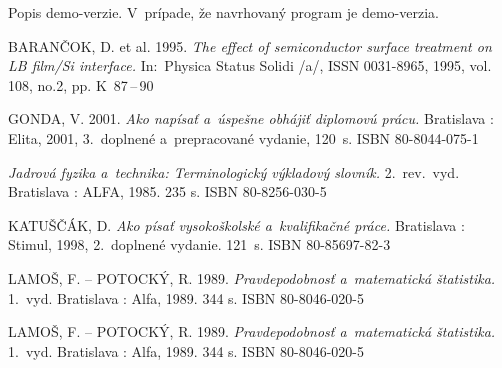\documentclass[a4paper]{pouzivatelskaPrirucka}
\begin{document}
Popis demo-verzie. V~prípade, že navrhovaný program je demo-verzia.

\newpage\def\refname{Zoznam použitej literatúry}

\begin{thebibliography}{999}
BARANČOK, D. et al. 1995. \emph{The effect of semiconductor surface treatment on LB film/Si interface.} In:~Physica Status Solidi /a/,  ISSN 0031-8965, 1995, vol. 108, no.2, pp. K~87\,--\,90

GONDA, V. 2001. \emph{Ako napísať a~úspešne obhájiť diplomovú prácu.} Bratislava : Elita, 2001, 3.~doplnené a~prepracované vydanie, 120~s. ISBN 80-8044-075-1

\emph{Jadrová fyzika a~technika: Terminologický výkladový slovník.} 2.~rev.~vyd. Bratislava : ALFA, 1985. 235 s. ISBN 80-8256-030-5

KATUŠČÁK, D. \emph{Ako písať vysokoškolské a~kvalifikačné práce.} Bratislava : Stimul, 1998, 2.~doplnené vydanie. 121~s. ISBN 80-85697-82-3

LAMOŠ, F. -- POTOCKÝ, R. 1989. \emph{Pravdepodobnosť a~matematická štatistika.} 1.~vyd. Bratislava : Alfa, 1989. 344 s. ISBN 80-8046-020-5

LAMOŠ, F. -- POTOCKÝ, R. 1989. \emph{Pravdepodobnosť a~matematická štatistika.} 1.~vyd. Bratislava : Alfa, 1989. 344 s. ISBN 80-8046-020-5
\end{thebibliography}



\end{document}
